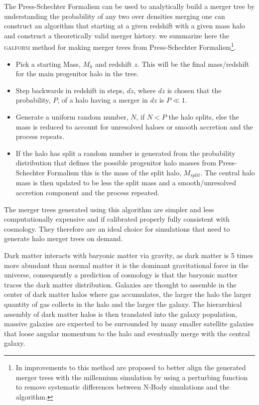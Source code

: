 The Press-Schechter Formalism can be used to analytically build a merger tree by understanding the probability of any two over densities merging one can construct an algorithm that starting at a given redshift with a given mass halo and construct a theoretically valid merger history. we summarize here the \textsc{galform} \citep{Cole2000} method for making merger trees from Press-Schechter Formalism\footnote{In \citet{Parkinson2008GeneratingTrees} improvements to this method are proposed to better align the generated merger trees with the millennium simulation by using a perturbing function to remove systematic differences between N-Body simulations and the algorithm.}.

\begin{itemize}
    \item Pick a starting Mass, $M_{h}$ and redshift $z$. This will be the final mass/redshift for the main progenitor halo in the tree.
    \item Step backwards in redshift in steps, $dz$, where $dz$ is chosen that the probability, $P$, of a halo having a merger in $dz$ is $P\ll1$.
    \item Generate a uniform random number, $N$, if $N<P$ the halo splits, else the mass is reduced to account for unresolved haloes or smooth accretion and the process repeats.
    \item If the halo has split a random number is generated from the probability distribution that defines the possible progenitor halo masses from  Press-Schechter Formalism this is the mass of the split halo, $M_{split}$. The central halo mass is then updated to be less the split mass and a smooth/unresolved accretion component and the process repeated.
\end{itemize}

The merger trees generated using this algorithm are simpler and less computationally expensive and if calibrated properly fully consistent with \LCDM cosmology. They therefore are an ideal choice for simulations that need to generate halo merger trees on demand.

Dark matter interacts with baryonic matter via gravity, as dark matter is 5 times more abundant than normal matter it is the dominant gravitational force in the universe, consequently a prediction of \LCDM cosmology is that the baryonic matter traces the dark matter distribution. Galaxies are thought to assemble in the center of dark matter halos where gas accumulates, the larger the halo the larger quantity of gas collects in the halo and the larger the galaxy. The hierarchical assembly of dark matter halos is then translated into the galaxy population, massive galaxies are expected to be surrounded by many smaller satellite galaxies that loose angular momentum to the halo and eventually merge with the central galaxy.

